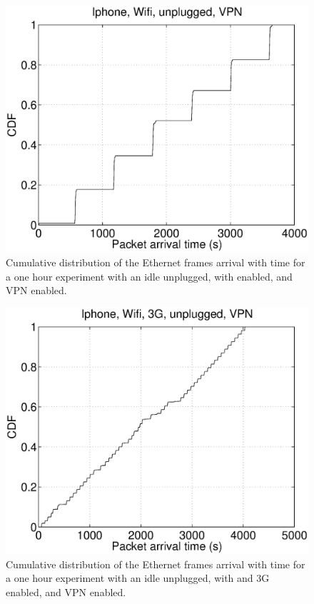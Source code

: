 \begin{figure}
\centering
        \includegraphics[width=0.8\linewidth]{../../code/pushNotification/Fig/bw_iphone_wifi_unplug_vpn_ts.eps}
  \caption{Cumulative distribution of the Ethernet frames
          arrival with time for a one hour experiment with an idle
          \iphone{} unplugged, with \wifi{} enabled, and VPN
          enabled.}
  \label{fig:push_wv_ts}
\end{figure}

\begin{figure}
\centering
        \includegraphics[width=0.8\linewidth]{../../code/pushNotification/Fig/bw_iphone_wifi_3g_unplug_vpn_ts.eps}
  \caption{Cumulative distribution of the Ethernet frames
          arrival with time for a one hour experiment with an idle
          \iphone{} unplugged, with \wifi{} and 3G enabled, and VPN
          enabled.}
  \label{fig:push_w3v_ts}
\end{figure}

